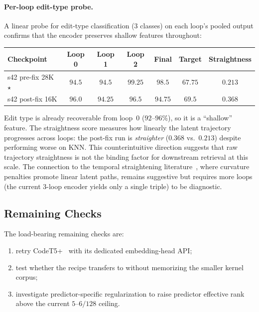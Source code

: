 \paragraph{Per-loop edit-type probe.}
A linear probe for edit-type classification (3 classes) on each loop's
pooled output confirms that the encoder preserves shallow features
throughout:

\begin{center}
\smallskip
\begin{tabular}{lcccccc}
\toprule
Checkpoint & Loop 0 & Loop 1 & Loop 2 & Final & Target & Straightness \\
\midrule
s42 pre-fix 28K $\star$ & $94.5$ & $94.5$ & $99.25$ & $98.5$ & $67.75$ & $0.213$ \\
s42 post-fix 16K & $96.0$ & $94.25$ & $96.5$ & $94.75$ & $69.5$ & $0.368$ \\
\bottomrule
\end{tabular}
\smallskip
\end{center}

Edit type is already recoverable from loop~0 ($92\text{--}96\%$),
so it is a ``shallow'' feature.  The straightness score measures how
linearly the latent trajectory progresses across loops: the post-fix
run is \emph{straighter} ($0.368$ vs.\ $0.213$) despite performing
worse on KNN.  This counterintuitive direction suggests that raw
trajectory straightness is not the binding factor for downstream
retrieval at this scale.  The connection to the temporal straightening
literature~\citep{straightening2026}, where curvature penalties promote
linear latent paths, remains suggestive but requires more loops
(the current 3-loop encoder yields only a single triple) to be
diagnostic.

\subsection{Remaining Checks}

The load-bearing remaining checks are:
\begin{enumerate}
    \item retry CodeT5+~\citep{wang2023codet5plus} with its dedicated
          embedding-head API;
    \item test whether the recipe transfers to \KernelWM{} without
          memorizing the smaller kernel corpus;
    \item investigate predictor-specific regularization to raise
          predictor effective rank above the current $5\text{--}6/128$
          ceiling.
\end{enumerate}
